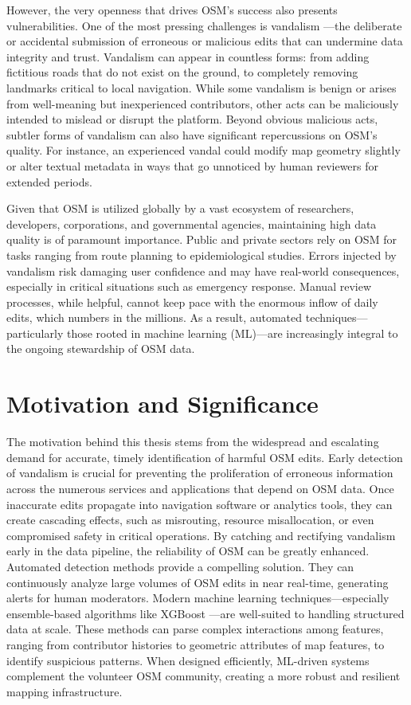 \documentclass[
    13pt, %
    a4paper, %
    DIV14, %
    listof=totoc, %
    bibliography=totoc, %
    index=totoc, %
    headsepline
]{scrreprt}
\begin{document}
However, the very openness that drives OSM’s success also presents vulnerabilities. One of the most pressing challenges is vandalism \cite{vandalism_osm}—the deliberate or accidental submission of erroneous or malicious edits that can undermine data integrity and trust. Vandalism can appear in countless forms: from adding fictitious roads that do not exist on the ground, to completely removing landmarks critical to local navigation. While some vandalism is benign or arises from well-meaning but inexperienced contributors, other acts can be maliciously intended to mislead or disrupt the platform. Beyond obvious malicious acts, subtler forms of vandalism can also have significant repercussions on OSM’s quality. For instance, an experienced vandal could modify map geometry slightly or alter textual metadata in ways that go unnoticed by human reviewers for extended periods.

Given that OSM is utilized globally by a vast ecosystem of researchers, developers, corporations, and governmental agencies, maintaining high data quality is of paramount importance. Public and private sectors rely on OSM for tasks ranging from route planning to epidemiological studies. Errors injected by vandalism risk damaging user confidence and may have real-world consequences, especially in critical situations such as emergency response. Manual review processes, while helpful, cannot keep pace with the enormous inflow of daily edits, which numbers in the millions. As a result, automated techniques—particularly those rooted in machine learning (ML)—are increasingly integral to the ongoing stewardship of OSM data.

\section{Motivation and Significance}
\label{sec:motivation_significance}

The motivation behind this thesis stems from the widespread and escalating demand for accurate, timely identification of harmful OSM edits. Early detection of vandalism is crucial for preventing the proliferation of erroneous information across the numerous services and applications that depend on OSM data. Once inaccurate edits propagate into navigation software or analytics tools, they can create cascading effects, such as misrouting, resource misallocation, or even compromised safety in critical operations. By catching and rectifying vandalism early in the data pipeline, the reliability of OSM can be greatly enhanced. Automated detection methods provide a compelling solution. They can continuously analyze large volumes of OSM edits in near real-time, generating alerts for human moderators. Modern machine learning techniques—especially ensemble-based algorithms like XGBoost \cite{xgboost_documentation, xgboost_paper}—are well-suited to handling structured data at scale. These methods can parse complex interactions among features, ranging from contributor histories to geometric attributes of map features, to identify suspicious patterns. When designed efficiently, ML-driven systems complement the volunteer OSM community, creating a more robust and resilient mapping infrastructure.
\end{document}
